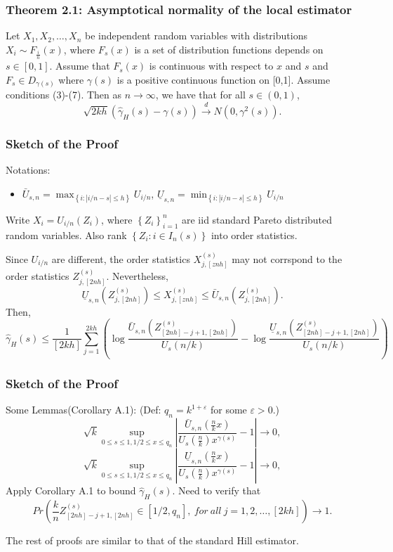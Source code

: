 \documentclass{beamer}
\newcommand{\suit}[1]{\left(#1\right)}
\newcommand{\abs}[1]{\left\vert#1\right\vert}
\newcommand{\set}[1]{\left\{#1\right\}}
\begin{document}
\begin{frame}
    \frametitle{Theorem 2.1: Asymptotical normality of the local estimator}

    \begin{theorem}[2.1]
        Let $X_1,X_2,\dots, X_n$ be independent random variables with distributions $X_i \sim F_{\frac{i}{n}}(x)$, where $F_s(x)$ is a set of distribution functions depends on $s\in [0,1]$. Assume that $F_s(x)$ is continuous with respect to $x$ and $s$ and $F_s \in D_{\gamma(s)}$ where $\gamma(s)$ is a positive continuous function on [0,1]. Assume conditions (3)-(7). Then as $n \to \infty$, we have that for all $s\in (0,1)$, 
$$
\sqrt{2kh}(\hat{\gamma}_H(s)-\gamma(s))\stackrel{d}{\to}N(0,\gamma^2(s)).
$$    
    \end{theorem}
\end{frame}

\begin{frame}
    \frametitle{Sketch of the Proof}
Notations:
    \begin{itemize}
        \item $\bar{U}_{s,n}=\max_{\set{i:\abs{i/n-s}\le h}} U_{i/n}$, $\underline{U}_{s,n}=\min_{\set{i:\abs{i/n-s}\le h}} U_{i/n}$
    \end{itemize}

Write  $X_i = U_{i/n}(Z_i)$, where $\set{Z_i}_{i=1}^n$ are iid standard Pareto distributed random variables. Also rank $\set{Z_i: i\in I_n(s)}$ into order statistics. 

{\color{blue} Since $U_{i/n}$ are different, the order statistics $X_{j,[znh]}^{(s)}$ may not corrspond to the order statistics $Z_{j,[2nh]}^{(s)}$.}
{\color{red}
Nevertheless, 
$$
\underline{U}_{s,n}(Z_{j,[2nh]}^{(s)}) \le X_{j,[znh]}^{(s)} \le \bar{U}_{s,n}(Z_{j,[2nh]}^{(s)}).
$$
}
Then,
$$
\hat{\gamma}_H(s)\le \frac{1}{[2kh]}\sum_{j=1}^{2kh} \suit{\log \frac{\bar{U}_{s,n}(Z_{[2nh]-j+1,[2nh]}^{(s)})}{U_s(n/k)} -\log \frac{\underline{U}_{s,n}(Z_{[2nh]-j+1,[2nh]}^{(s)})}{U_s(n/k)}}
$$
\end{frame}

\begin{frame}
    \frametitle{Sketch of the Proof}
Some Lemmas(Corollary A.1): (Def: $q_n=k^{1+\varepsilon}$ for some $\varepsilon>0$.)
$$
\sqrt{k}\sup_{0\le s\le 1, 1/2\le x \le q_n} \abs{\frac{\bar{U}_{s,n}(\frac{n}{k}x)}{U_s(\frac{n}{k})x^{\gamma(s)}}-1} \to 0,
$$
$$
\sqrt{k}\sup_{0\le s\le 1, 1/2\le x \le q_n} \abs{\frac{\underline{U}_{s,n}(\frac{n}{k}x)}{U_s(\frac{n}{k})x^{\gamma(s)}}-1} \to 0,
$$
Apply Corollary A.1 to bound $\hat{\gamma}_H(s)$. 
{\color{blue} Need to verify that
$$
Pr\suit{\frac{k}{n} Z_{[2nh]-j+1,[2nh]}^{(s)} \in [1/2,q_n], \ for \ all \ j=1,2,\dots,[2kh]} \to 1.
$$}

The rest of proofs are similar to that of the standard Hill estimator.
\end{frame}
\end{document}
